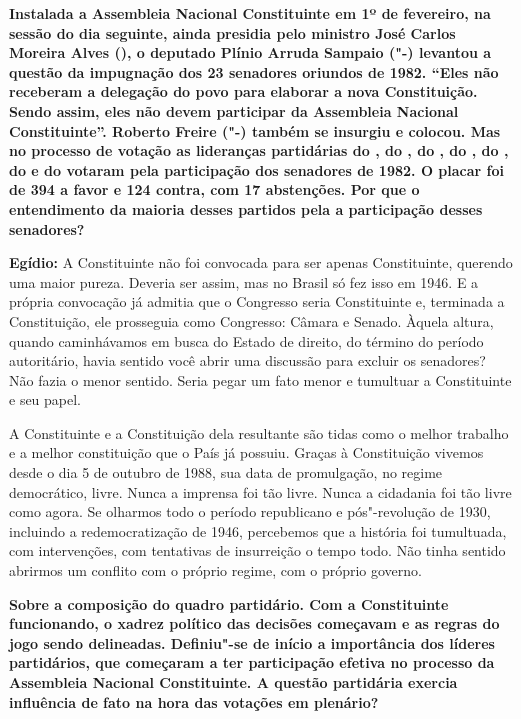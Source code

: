 \textbf{Instalada a Assembleia Nacional Constituinte em 1º de fevereiro,
na sessão do dia seguinte, ainda presidia pelo ministro José Carlos
Moreira Alves (), o deputado Plínio Arruda Sampaio ("-) levantou a
questão da impugnação dos 23 senadores oriundos de 1982. ``Eles não
receberam a delegação do povo para elaborar a nova Constituição. Sendo
assim, eles não devem participar da Assembleia Nacional Constituinte''.
Roberto Freire ("-) também se insurgiu e colocou. Mas no processo de
votação as lideranças partidárias do , do , do , do , do
, do  e do  votaram pela participação dos senadores de 1982. O
placar foi de 394 a favor e 124 contra, com 17 abstenções. Por que o
entendimento da maioria desses partidos pela a participação desses
senadores?}

\textbf{Egídio:} A Constituinte não foi convocada para ser apenas
Constituinte, querendo uma maior pureza. Deveria ser assim, mas no
Brasil só fez isso em 1946. E a própria convocação já admitia que o
Congresso seria Constituinte e, terminada a Constituição, ele prosseguia
como Congresso: Câmara e Senado. Àquela altura, quando caminhávamos em
busca do Estado de direito, do término do período autoritário, havia
sentido você abrir uma discussão para excluir os senadores? Não fazia o
menor sentido. Seria pegar um fato menor e tumultuar a Constituinte e
seu papel.

A Constituinte e a Constituição dela resultante são tidas como o melhor
trabalho e a melhor constituição que o País já possuiu. Graças à
Constituição vivemos desde o dia 5 de outubro de 1988, sua data de
promulgação, no regime democrático, livre. Nunca a imprensa foi tão
livre. Nunca a cidadania foi tão livre como agora. Se olharmos todo o
período republicano e pós"-revolução de 1930, incluindo a
redemocratização de 1946, percebemos que a história foi tumultuada, com
intervenções, com tentativas de insurreição o tempo todo. Não tinha
sentido abrirmos um conflito com o próprio regime, com o próprio
governo.

\textbf{Sobre a composição do quadro partidário. Com a Constituinte
funcionando, o xadrez político das decisões começavam e as regras do
jogo sendo delineadas. Definiu"-se de início a importância dos líderes
partidários, que começaram a ter participação efetiva no processo da
Assembleia Nacional Constituinte. A questão partidária exercia
influência de fato na hora das votações em plenário?}

